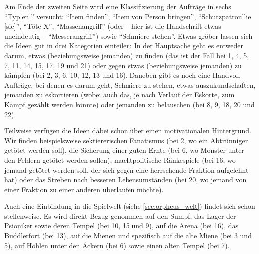 \documentclass[a5paper,pagesize]{scrbook}
\begin{document}
Am Ende der zweiten Seite wird eine Klassifizierung der Aufträge in sechs \enquote{\uline{Typ[en]}} versucht:
\enquote{Item finden}, \enquote{Item von Person bringen}, \enquote{Schutzpatroullie [sic]}, \enquote{Töte X}, \enquote{Massenangriff} (oder -- hier ist die Handschrift etwas uneindeutig -- \enquote{Messerangriff}) sowie \enquote{Schmiere stehen}.
Etwas gröber lassen sich die Ideen gut in drei Kategorien einteilen:
In der Hauptsache geht es entweder darum, etwas (beziehungsweise jemanden) zu finden (das ist der Fall bei 1, 4, 5, 7, 11, 14, 15, 17, 19 und 21) oder gegen etwas (beziehungsweise jemanden) zu kämpfen (bei 2, 3, 6, 10, 12, 13 und 16).
Daneben gibt es noch eine Handvoll Aufträge, bei denen es darum geht, Schmiere zu stehen, etwas auszukundschaften, jemanden zu eskortieren (wobei auch das, je nach Verlauf der Eskorte, zum Kampf gezählt werden könnte) oder jemanden zu belauschen (bei 8, 9, 18, 20 und 22).

Teilweise verfügen die Ideen dabei schon über einen motivationalen Hintergrund.
Wir finden beispielsweise sektiererischen Fanatismus (bei 2, wo ein Abtrünniger getötet werden soll), die Sicherung einer guten Ernte (bei 6, wo Monster unter den Feldern getötet werden sollen), machtpolitische Ränkespiele (bei 16, wo jemand getötet werden soll, der sich gegen eine herrschende Fraktion aufgelehnt hat) oder das Streben nach besseren Lebensumständen (bei 20, wo jemand von einer Fraktion zu einer anderen überlaufen möchte).

Auch eine Einbindung in die Spielwelt (siehe \autoref{sec:orpheus_welt}) findet sich schon stellenweise.
Es wird direkt Bezug genommen auf den Sumpf, das Lager der Psioniker sowie deren Tempel (bei 10, 15 und 9), auf die Arena (bei 16), das Buddlerfort (bei 13), auf die Mienen und spezifisch auf die alte Miene (bei 3 und 5), auf Höhlen unter den Äckern (bei 6) sowie einen alten Tempel (bei 7).
\end{document}
